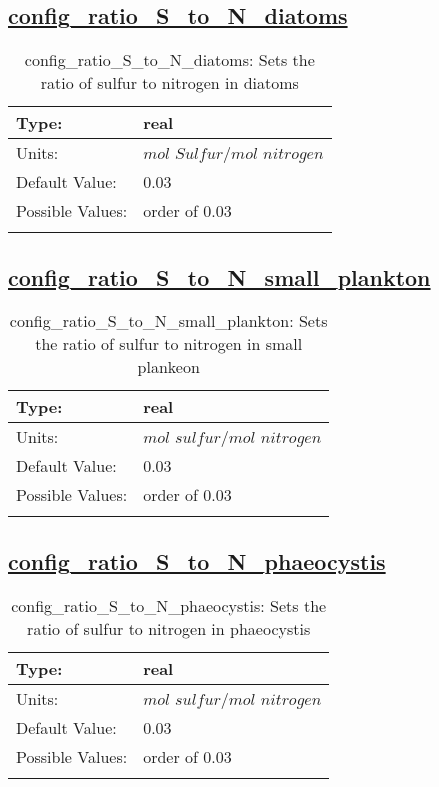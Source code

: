 \subsection[config\_ratio\_S\_to\_N\_diatoms]{\hyperref[sec:nm_tab_biogeochemistry]{config\_ratio\_S\_to\_N\_diatoms}}
\label{subsec:nm_sec_config_ratio_S_to_N_diatoms}
\begin{center}
\begin{longtable}{| p{2.0in} || p{4.0in} |}
    \hline
    Type: & real \\
    \hline
    Units: & $mol$ $Sulfur/mol$ $nitrogen$ \\
    \hline
    Default Value: & 0.03 \\
    \hline
    Possible Values: & order of 0.03 \\
    \hline
    \caption{config\_ratio\_S\_to\_N\_diatoms: Sets the ratio of sulfur to nitrogen in diatoms}
\end{longtable}
\end{center}
\subsection[config\_ratio\_S\_to\_N\_small\_plankton]{\hyperref[sec:nm_tab_biogeochemistry]{config\_ratio\_S\_to\_N\_small\_plankton}}
\label{subsec:nm_sec_config_ratio_S_to_N_small_plankton}
\begin{center}
\begin{longtable}{| p{2.0in} || p{4.0in} |}
    \hline
    Type: & real \\
    \hline
    Units: & $mol$ $sulfur/mol$ $nitrogen$ \\
    \hline
    Default Value: & 0.03 \\
    \hline
    Possible Values: & order of 0.03 \\
    \hline
    \caption{config\_ratio\_S\_to\_N\_small\_plankton: Sets the ratio of sulfur to nitrogen in small plankeon}
\end{longtable}
\end{center}
\subsection[config\_ratio\_S\_to\_N\_phaeocystis]{\hyperref[sec:nm_tab_biogeochemistry]{config\_ratio\_S\_to\_N\_phaeocystis}}
\label{subsec:nm_sec_config_ratio_S_to_N_phaeocystis}
\begin{center}
\begin{longtable}{| p{2.0in} || p{4.0in} |}
    \hline
    Type: & real \\
    \hline
    Units: & $mol$ $sulfur/mol$ $nitrogen$ \\
    \hline
    Default Value: & 0.03 \\
    \hline
    Possible Values: & order of 0.03 \\
    \hline
    \caption{config\_ratio\_S\_to\_N\_phaeocystis: Sets the ratio of sulfur to nitrogen in phaeocystis}
\end{longtable}
\end{center}
